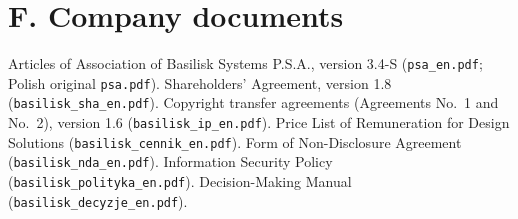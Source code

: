 \section*{F. Company documents}
\begin{BibList}
 Articles of Association of Basilisk Systems P.S.A., version 3.4-S (\texttt{psa\_en.pdf}; Polish original \texttt{psa.pdf}).
 Shareholders' Agreement, version 1.8 (\texttt{basilisk\_sha\_en.pdf}).
 Copyright transfer agreements (Agreements No.~1 and No.~2), version 1.6 (\texttt{basilisk\_ip\_en.pdf}).
 Price List of Remuneration for Design Solutions (\texttt{basilisk\_cennik\_en.pdf}).
 Form of Non-Disclosure Agreement (\texttt{basilisk\_nda\_en.pdf}).
 Information Security Policy (\texttt{basilisk\_polityka\_en.pdf}).
 Decision-Making Manual (\texttt{basilisk\_decyzje\_en.pdf}).
\end{BibList}
